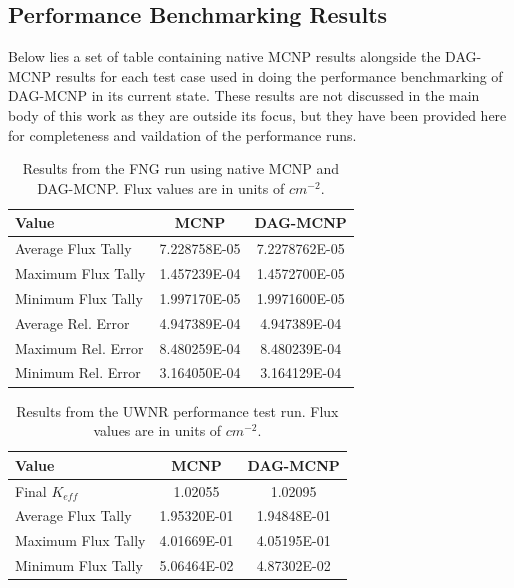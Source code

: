 \documentclass[12pt, a4paper]{article}
\begin{document}
\subsection{Performance Benchmarking Results}%

Below lies a set of table containing native MCNP results alongside the DAG-MCNP results for each test case used in doing the performance benchmarking of DAG-MCNP in its current state. These results are not discussed in the main body of this work as they are outside its focus, but they have been provided here for completeness and vaildation of the performance runs.

\begin{table}[H]
  \caption{Results from the FNG run using native MCNP and DAG-MCNP. Flux values are in units of  $cm^{-2}$.}
  \label{fng_perf_results}
  \centering
  \begin{tabular}{l c c}
    \toprule
    Value & MCNP & DAG-MCNP \\
    \hline
    Average Flux Tally & 7.228758E-05 & 7.2278762E-05 \\
    \hline
    Maximum Flux Tally & 1.457239E-04 & 1.4572700E-05 \\
    \hline
    Minimum Flux Tally & 1.997170E-05 & 1.9971600E-05 \\
    \hline
    Average Rel. Error & 4.947389E-04 & 4.947389E-04 \\
    \hline
    Maximum Rel. Error & 8.480259E-04 & 8.480239E-04 \\
    \hline
    Minimum Rel. Error & 3.164050E-04 & 3.164129E-04 \\
    \bottomrule
  \end{tabular}  
\end{table}

\begin{table}[H]
  \centering
  \caption{Results from the UWNR performance test run. Flux values are in units of $cm^{-2}$.}
  \label{uwnr_perf_results}
  \begin{tabular}{l c c}
    \toprule
    Value & MCNP & DAG-MCNP \\
    \hline
    Final $K_{eff}$ & 1.02055 & 1.02095 \\
    \hline
    Average Flux Tally & 1.95320E-01 & 1.94848E-01 \\
    \hline
    Maximum Flux Tally & 4.01669E-01 & 4.05195E-01 \\
    \hline
    Minimum Flux Tally & 5.06464E-02 & 4.87302E-02 \\
    \bottomrule
  \end{tabular}
\end{table}
\end{document}
